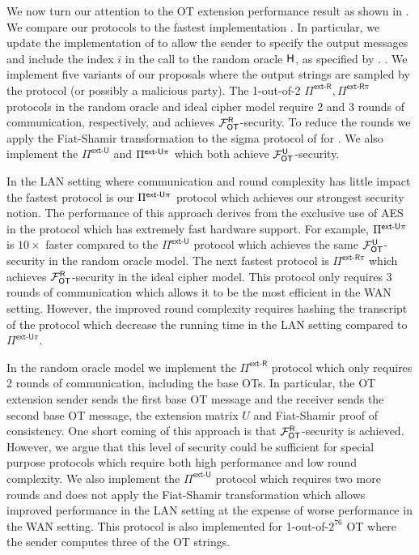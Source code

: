 We now turn our attention to the  OT extension performance result as shown in . We compare our protocols to the fastest implementation \cite{C:KelOrsSch15,libOTe}. In particular, we update the \cite{libOTe} implementation of \cite{C:KelOrsSch15} to allow the sender to specify the output messages and include the index $i$ in the call to the random oracle $\mathsf{H}$, as specified by \cite{C:KelOrsSch15}. . We implement five variants of our proposals where the output strings are sampled by the protocol (or possibly a malicious party). The 1-out-of-2 $\Pi^{\textsf{ext-R}},\Pi^{\textsf{ext-R}\pi}$ protocols in the random oracle and ideal cipher model require 2 and 3 rounds of communication, respectively, and achieves $\mathcal{F}_{\mathsf{OT}}^\mathsf{R}$-security. To reduce the rounds we apply the Fiat-Shamir transformation \cite{C:FiaSha86} to the sigma protocol of \cite{C:KelOrsSch15} for . We also implement the $\Pi^{\textsf{ext-U}}$ and $\Pi^{\textsf{ext-\ensuremath{\mathsf{U}}}\pi}$ which both achieve $\mathcal{F}_{\mathsf{OT}}^\mathsf{U}$-security. 

In the LAN setting where communication and round complexity has little impact the fastest protocol is our $\Pi^{\textsf{ext-\ensuremath{\mathsf{U}}}\pi}$ protocol which achieves our strongest security notion. The performance of this approach derives from the exclusive use of AES in the protocol which has extremely fast hardware support. For example, $\Pi^{\textsf{ext-\ensuremath{\mathsf{U}}}\pi}$ is $10\times$ faster compared to the $\Pi^{\textsf{ext-U}}$ protocol which achieves the same $\mathcal{F}_{\mathsf{OT}}^\mathsf{U}$-security in the random oracle model. The next fastest protocol is $\Pi^{\textsf{ext-R}\pi}$ which achieves $\mathcal{F}_{\mathsf{OT}}^\mathsf{R}$-security in the ideal cipher model. This protocol only requires 3 rounds of communication which allows it to be the most efficient in the WAN setting. However, the improved round complexity requires hashing the transcript of the protocol which decrease the running time in the LAN setting compared to $\Pi^{\textsf{ext-U}\pi}$.

In the random oracle model we implement the $\Pi^{\textsf{ext-R}}$ protocol which only requires 2 rounds of communication, including the base OTs. In particular, the OT extension sender sends the first base OT message and the receiver sends the second base OT message, the extension matrix $U$ and Fiat-Shamir proof of consistency. One short coming of this approach is that $\mathcal{F}_{\mathsf{OT}}^\mathsf{R}$-security is achieved. However, we argue that this level of security could be sufficient for special purpose protocols which require both high performance and low round complexity. We also implement the $\Pi^{\textsf{ext-U}}$ protocol which requires two more rounds and does not apply the Fiat-Shamir transformation which allows improved performance in the LAN setting at the expense of worse performance in the WAN setting.  This protocol is also implemented for 1-out-of-$2^{76}$ OT where the sender computes three of the OT strings. 

